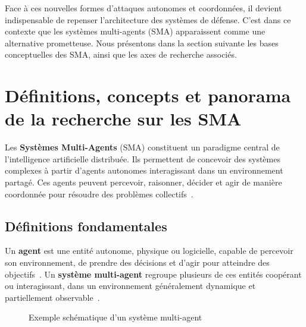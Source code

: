 \documentclass[ twoside,openright,titlepage,numbers=noenddot,headinclude,%
                footinclude=true,cleardoublepage=empty,abstractoff, %
                BCOR=5mm,paper=a4,fontsize=11pt,%
                french,american,%
                ]{scrreprt}
\begin{document}
\noindent
Face à ces nouvelles formes d’attaques autonomes et coordonnées, il devient indispensable de repenser l’architecture des systèmes de défense. C’est dans ce contexte que les systèmes multi-agents (SMA) apparaissent comme une alternative prometteuse. Nous présentons dans la section suivante les bases conceptuelles des SMA, ainsi que les axes de recherche associés.

\section{Définitions, concepts et panorama de la recherche sur les SMA}\label{sec:sma-concepts}


Les \textbf{Systèmes Multi-Agents} (SMA) constituent un paradigme central de l'intelligence artificielle distribuée. Ils permettent de concevoir des systèmes complexes à partir d'agents autonomes interagissant dans un environnement partagé. Ces agents peuvent percevoir, raisonner, décider et agir de manière coordonnée pour résoudre des problèmes collectifs~\cite{Ferber1999,Wooldridge2009}.

\subsection*{Définitions fondamentales}

Un \textbf{agent} est une entité autonome, physique ou logicielle, capable de percevoir son environnement, de prendre des décisions et d’agir pour atteindre des objectifs~\cite{Russell2010}. Un \textbf{système multi-agent} regroupe plusieurs de ces entités coopérant ou interagissant, dans un environnement généralement dynamique et partiellement observable~\cite{Jennings1998,Shoham2009}.

\begin{figure}[h]
    \centering
    \caption{Exemple schématique d'un système multi-agent}
    \label{fig:sma_architecture}
\end{figure}
\end{document}
